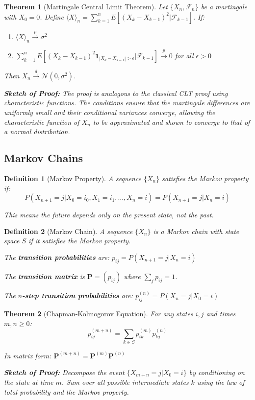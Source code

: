 \documentclass[12pt,a4paper]{article}
\newtheorem{theorem}{Theorem}[section]
\newtheorem{definition}{Definition}[section]
\theoremstyle{remark}
\begin{document}
\begin{theorem}[Martingale Central Limit Theorem]
Let $\{X_n, \mathcal{F}_n\}$ be a martingale with $X_0 = 0$. Define $\langle X \rangle_n = \sum_{k=1}^n E[(X_k - X_{k-1})^2|\mathcal{F}_{k-1}]$. If:
\begin{enumerate}
\item $\langle X \rangle_n \stackrel{p}{\to} \sigma^2$
\item $\sum_{k=1}^n E[(X_k - X_{k-1})^2 \mathbf{1}_{|X_k - X_{k-1}| > \epsilon}|\mathcal{F}_{k-1}] \stackrel{p}{\to} 0$ for all $\epsilon > 0$
\end{enumerate}
Then $X_n \stackrel{d}{\to} \mathcal{N}(0, \sigma^2)$.

\textbf{Sketch of Proof:} The proof is analogous to the classical CLT proof using characteristic functions. The conditions ensure that the martingale differences are uniformly small and their conditional variances converge, allowing the characteristic function of $X_n$ to be approximated and shown to converge to that of a normal distribution.
\end{theorem}

\subsection{Markov Chains}

\begin{definition}[Markov Property]
A sequence $\{X_n\}$ satisfies the Markov property if:
$$P(X_{n+1} = j | X_0 = i_0, X_1 = i_1, \ldots, X_n = i) = P(X_{n+1} = j | X_n = i)$$

This means the future depends only on the present state, not the past.
\end{definition}

\begin{definition}[Markov Chain]
A sequence $\{X_n\}$ is a Markov chain with state space $S$ if it satisfies the Markov property.

The \textbf{transition probabilities} are: $p_{ij} = P(X_{n+1} = j | X_n = i)$

The \textbf{transition matrix} is $\mathbf{P} = (p_{ij})$ where $\sum_j p_{ij} = 1$.

The \textbf{$n$-step transition probabilities} are: $p_{ij}^{(n)} = P(X_n = j | X_0 = i)$
\end{definition}

\begin{theorem}[Chapman-Kolmogorov Equation]
For any states $i, j$ and times $m, n \geq 0$:
$$p_{ij}^{(m+n)} = \sum_{k \in S} p_{ik}^{(m)} p_{kj}^{(n)}$$

In matrix form: $\mathbf{P}^{(m+n)} = \mathbf{P}^{(m)} \mathbf{P}^{(n)}$

\textbf{Sketch of Proof:} Decompose the event $\{X_{m+n}=j | X_0=i\}$ by conditioning on the state at time $m$. Sum over all possible intermediate states $k$ using the law of total probability and the Markov property.
\end{theorem}
\end{document}
